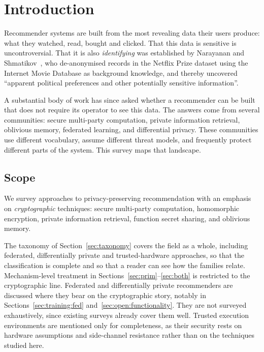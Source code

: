 \section{Introduction}
\label{sec:intro}

Recommender systems are built from the most revealing data their users produce: what they watched,
read, bought and clicked. That this data is sensitive is uncontroversial. That it is also
\emph{identifying} was established by Narayanan and Shmatikov~\cite{narayanan2008}, who
de-anonymised records in the Netflix Prize dataset using the Internet Movie Database as background
knowledge, and thereby uncovered ``apparent political preferences and other potentially sensitive
information''.

A substantial body of work has since asked whether a recommender can be built that does not
require its operator to see this data. The answers come from several communities: secure
multi-party computation, private information retrieval, oblivious memory, federated learning, and
differential privacy. These communities use different vocabulary, assume different threat models,
and frequently protect different parts of the system. This survey maps that landscape.

\subsection{Scope}
\label{sec:intro:scope}

We survey approaches to privacy-preserving recommendation with an emphasis on
\emph{cryptographic} techniques: secure multi-party computation, homomorphic encryption, private
information retrieval, function secret sharing, and oblivious memory.

The taxonomy of Section~\ref{sec:taxonomy} covers the field as a whole, including federated,
differentially private and trusted-hardware approaches, so that the classification is complete and
so that a reader can see how the families relate. Mechanism-level treatment in
Sections~\ref{sec:prim}--\ref{sec:both} is restricted to the cryptographic line. Federated and
differentially private recommenders are discussed where they bear on the cryptographic story,
notably in Sections~\ref{sec:training:fed} and~\ref{sec:open:functionality}. They are not
surveyed exhaustively, since existing surveys already cover them well. Trusted execution environments are
mentioned only for completeness, as their security rests on hardware assumptions and side-channel
resistance rather than on the techniques studied here.

